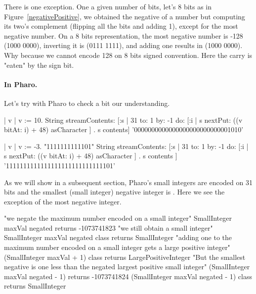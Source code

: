 \documentclass[a4paper,10pt,twoside]{book}
\begin{document}
There is one exception. One a given number of bits, let's 8 bits as in Figure~\ref{negativePositive},
we obtained the negative of a number but computing its two's complement (flipping all the bits and adding 1), except for the most negative number. On a 8 bits representation, the most negative number is -128 (1000 0000), inverting it is (0111 1111), and adding one results in (1000 0000). Why because we cannot encode 128 on 8 bits signed convention. Here the carry is "eaten" by the sign bit. 

\paragraph{In Pharo.}
Let's try with Pharo to check a bit our understanding. 

%

\begin{code}{}
| v |
v := 10. 
String streamContents: [:s | 
	31 to: 1 by: -1 do: [:i | s nextPut: ((v bitAt: i) + 48) asCharacter   ] .
	s contents] 
	 '0000000000000000000000000001010'

| v |
v := -3.  "1111111111101"
String streamContents: [:s | 
	31 to: 1 by: -1 do: [:i | s nextPut: ((v bitAt: i) + 48) asCharacter   ] .
	s contents ]
	 '1111111111111111111111111111101' 
\end{code}
	
As we will show in a subsequent section, Pharo's small integers are encoded on 31 bits and the smallest (small integer) negative
integer is . Here we see the exception of the most negative integer.

\begin{code}{} 
"we negate the maximum number encoded on a small integer"
SmallInteger maxVal negated	 
	  	returns -1073741823
"we still obtain a small integer"		
SmallInteger maxVal negated class
		returns SmallInteger
"adding one to the maximum number encoded on a small integer gets a large positive integer"
(SmallInteger maxVal + 1) class
		returns LargePositiveInteger		
"But the smallest negative is one less than the negated largest positive small integer"		
(SmallInteger maxVal negated - 1) 
		returns -1073741824 
(SmallInteger maxVal negated - 1) class 
		returns SmallInteger 		 
\end{code}
\end{document}
